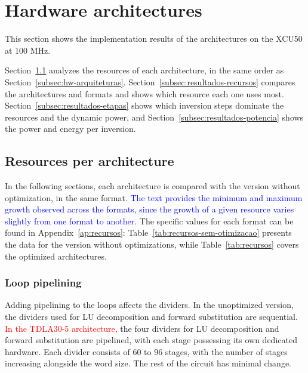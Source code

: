\FloatBarrier
\section{\texorpdfstring{Hardware architectures}{Hardware architectures}}\label{sec:resultados-hardware}

This section shows the implementation results of the architectures on the XCU50 at 100 MHz.

Section~\ref{subsec:resultados-recursos-arquitetura} analyzes the resources of each architecture, in the same order as Section~\ref{subsec:hw-arquiteturas}. Section~\ref{subsec:resultados-recursos} compares the architectures and formats and shows which resource each one uses most. Section~\ref{subsec:resultados-etapas} shows which inversion steps dominate the resources and the dynamic power, and Section~\ref{subsec:resultados-potencia} shows the power and energy per inversion.

\subsection{\texorpdfstring{Resources per architecture}{Resources per architecture}}\label{subsec:resultados-recursos-arquitetura}
In the following sections, each architecture is compared with the version without optimization, in the same format. \textcolor{blue}{The text provides the minimum and maximum growth observed across the formats, since the growth of a given resource varies slightly from one format to another.} The specific values for each format can be found in Appendix~\ref{ap:recursos}: Table~\ref{tab:recursos-sem-otimizacao} presents the data for the version without optimizations, while Table~\ref{tab:recursos} covers the optimized architectures.

\subsubsection{\texorpdfstring{Loop pipelining}{Loop pipelining}}\label{subsubsec:resultados-pipeline-lacos}
Adding pipelining to the loops affects the dividers. In the unoptimized version, the dividers used for LU decomposition and forward substitution are sequential. \textcolor{red}{In the TDLA30-5 architecture}, the four dividers for LU decomposition and forward substitution are pipelined, with each stage possessing its own dedicated hardware. Each divider consists of 60 to 96 stages, with the number of stages increasing alongside the word size. The rest of the circuit has minimal change.

